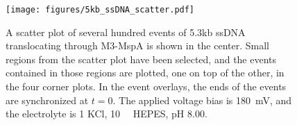 \begin{figure}[h]
\begin{centering}
\texttt{[image: figures/5kb\_ssDNA\_scatter.pdf]}
\caption[Scatter plot of 5.3kb ssDNA in MspA]{A scatter plot of several hundred events of 5.3kb ssDNA translocating through M3-MspA is shown in the center.  Small regions from the scatter plot have been selected, and the events contained in those regions are plotted, one on top of the other, in the four corner plots.  In the event overlays, the ends of the events are synchronized at $t=0$.  The applied voltage bias is \SI{180}{\mV}, and the electrolyte is \SI{1}{\Molar} KCl, \SI{10}{\milli\Molar} HEPES, pH \num{8.00}.}
\label{fig:mspa_5kb_scatter}
\end{centering}
\end{figure}

